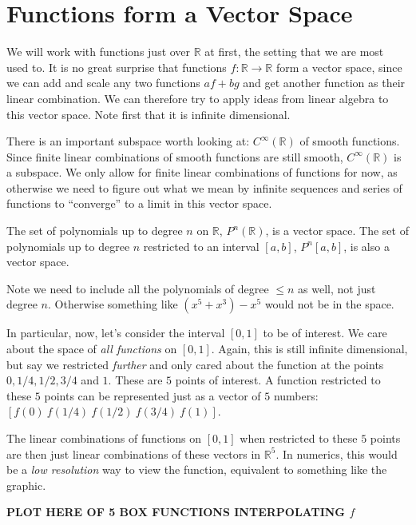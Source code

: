\section{Functions form a Vector Space} %
\label{sec:functions_form_a_vector_space}

	We will work with functions just over $\mathbb R$ at first, the setting that we are most used to. It is no great surprise that functions $f:\mathbb{R} \rightarrow \mathbb R$ form a vector space, since we can add and scale any two functions $a f + b g$ and get another function as their linear combination. We can therefore try to apply ideas from linear algebra to this vector space. Note first that it is infinite dimensional. 
	
	There is an important subspace worth looking at: $C^{\infty} (\mathbb R)$ of smooth functions. Since finite linear combinations of smooth functions are still smooth, $C^{\infty} (\mathbb R)$ is a subspace. We only allow for finite linear combinations of functions for now, as otherwise we need to figure out what we mean by infinite sequences and series of functions to ``converge'' to a limit in this vector space. 
	
	\begin{example}
		The set of polynomials up to degree $n$ on $\mathbb{R}$, $P^n(\mathbb R)$, is a vector space. The set of polynomials up to degree $n$ restricted to an interval $[a,b]$, $P^n[a,b]$, is also a vector space. 
	\end{example}
	Note we need to include all the polynomials of degree $\leq n$ as well, not just degree $n$. Otherwise something like $(x^{5} + x^{3}) - x^{5}$ would not be in the space. 
	
	In particular, now, let's consider the interval $[0,1]$ to be of interest. We care about the space of \emph{all functions} on $[0,1]$. Again, this is still infinite dimensional, but say we restricted \emph{further} and only cared about the function at the points $0, 1/4, 1/2, 3/4$ and $1$. These are $5$ points of interest. A function restricted to these $5$ points can be represented just as a vector of $5$ numbers: $[f(0) ~ f(1/4) ~ f(1/2) ~ f(3/4) ~ f(1)]$.
	
	The linear combinations of functions on $[0,1]$ when restricted to these $5$ points are then just linear combinations of these vectors in $\mathbb{R}^5$. In numerics, this would be a \emph{low resolution} way to view the function, equivalent to something like the graphic.

	\textbf{PLOT HERE OF 5 BOX FUNCTIONS INTERPOLATING $f$}
	
